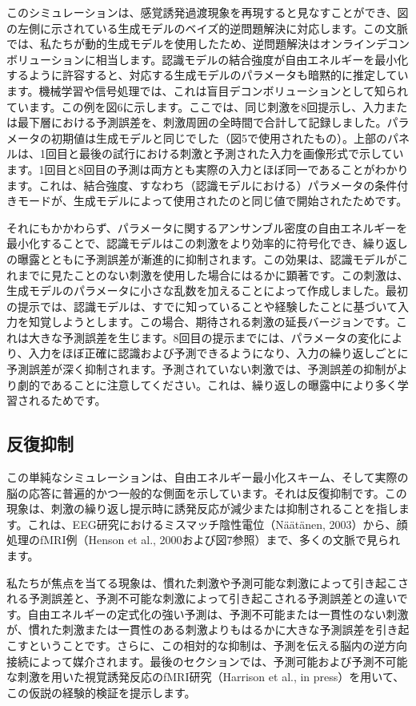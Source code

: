 \documentclass{article}
\begin{document}
このシミュレーションは、感覚誘発過渡現象を再現すると見なすことができ、図の左側に示されている生成モデルのベイズ的逆問題解決に対応します。この文脈では、私たちが動的生成モデルを使用したため、逆問題解決はオンラインデコンボリューションに相当します。認識モデルの結合強度が自由エネルギーを最小化するように許容すると、対応する生成モデルのパラメータも暗黙的に推定しています。機械学習や信号処理では、これは盲目デコンボリューションとして知られています。この例を図6に示します。ここでは、同じ刺激を8回提示し、入力または最下層における予測誤差を、刺激周囲の全時間で合計して記録しました。パラメータの初期値は生成モデルと同じでした（図5で使用されたもの）。上部のパネルは、1回目と最後の試行における刺激と予測された入力を画像形式で示しています。1回目と8回目の予測は両方とも実際の入力とほぼ同一であることがわかります。これは、結合強度、すなわち（認識モデルにおける）パラメータの条件付きモードが、生成モデルによって使用されたのと同じ値で開始されたためです。

それにもかかわらず、パラメータに関するアンサンブル密度の自由エネルギーを最小化することで、認識モデルはこの刺激をより効率的に符号化でき、繰り返しの曝露とともに予測誤差が漸進的に抑制されます。この効果は、認識モデルがこれまでに見たことのない刺激を使用した場合にはるかに顕著です。この刺激は、生成モデルのパラメータに小さな乱数を加えることによって作成しました。最初の提示では、認識モデルは、すでに知っていることや経験したことに基づいて入力を知覚しようとします。この場合、期待される刺激の延長バージョンです。これは大きな予測誤差を生じます。8回目の提示までには、パラメータの変化により、入力をほぼ正確に認識および予測できるようになり、入力の繰り返しごとに予測誤差が深く抑制されます。予測されていない刺激では、予測誤差の抑制がより劇的であることに注意してください。これは、繰り返しの曝露中により多く学習されるためです。

\subsection{反復抑制}
この単純なシミュレーションは、自由エネルギー最小化スキーム、そして実際の脳の応答に普遍的かつ一般的な側面を示しています。それは反復抑制です。この現象は、刺激の繰り返し提示時に誘発反応が減少または抑制されることを指します。これは、EEG研究におけるミスマッチ陰性電位（Näätänen, 2003）から、顔処理のfMRI例（Henson et al., 2000および図7参照）まで、多くの文脈で見られます。

私たちが焦点を当てる現象は、慣れた刺激や予測可能な刺激によって引き起こされる予測誤差と、予測不可能な刺激によって引き起こされる予測誤差との違いです。自由エネルギーの定式化の強い予測は、予測不可能または一貫性のない刺激が、慣れた刺激または一貫性のある刺激よりもはるかに大きな予測誤差を引き起こすということです。さらに、この相対的な抑制は、予測を伝える脳内の逆方向接続によって媒介されます。最後のセクションでは、予測可能および予測不可能な刺激を用いた視覚誘発反応のfMRI研究（Harrison et al., in press）を用いて、この仮説の経験的検証を提示します。
\end{document}
